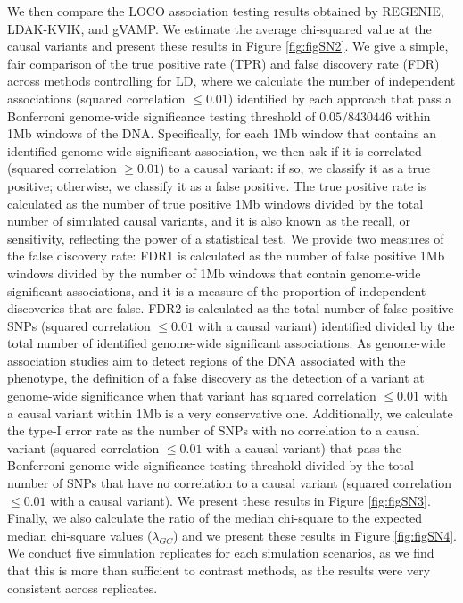 We then compare the LOCO association testing results obtained by REGENIE, LDAK-KVIK, and gVAMP. We estimate the average chi-squared value at the causal variants and present these results in Figure \ref{fig:figSN2}. We give a simple, fair comparison of the true positive rate (TPR) and false discovery rate (FDR) across methods controlling for LD, where we calculate the number of independent associations (squared correlation $\leq 0.01$) identified by each approach that pass a Bonferroni genome-wide significance testing threshold of $0.05/8430446$ within 1Mb windows of the DNA. Specifically, for each 1Mb window that contains an identified genome-wide significant association, we then ask if it is correlated (squared correlation $\geq 0.01$) to a causal variant: if so, we classify it as a true positive; otherwise, we classify it as a false positive. The true positive rate is calculated as the number of true positive 1Mb windows divided by the total number of simulated causal variants, and it is also known as the recall, or sensitivity, reflecting the power of a statistical test. We provide two measures of the false discovery rate: FDR1 is calculated as the number of false positive 1Mb windows divided by the number of 1Mb windows that contain genome-wide significant associations, and it is a measure of the proportion of independent discoveries that are false. FDR2 is calculated as the total number of false positive SNPs (squared correlation $\leq 0.01$ with a causal variant) identified divided by the total number of identified genome-wide significant associations. As genome-wide association studies aim to detect regions of the DNA associated with the phenotype, the definition of a false discovery as the detection of a variant at genome-wide significance when that variant has squared correlation $\leq 0.01$ with a causal variant within 1Mb is a very conservative one. Additionally, we calculate the type-I error rate as the number of SNPs with no correlation to a causal variant (squared correlation $\leq 0.01$ with a causal variant) that pass the Bonferroni genome-wide significance testing threshold divided by the total number of SNPs that have no correlation to a causal variant (squared correlation $\leq 0.01$ with a causal variant). We present these results in Figure \ref{fig:figSN3}. Finally, we also calculate the ratio of the median chi-square to the expected median chi-square values ($\lambda_{GC}$) and we present these results in Figure \ref{fig:figSN4}. We conduct five simulation replicates for each simulation scenarios, as we find that this is more than sufficient to contrast methods, as the results were very consistent across replicates. 

